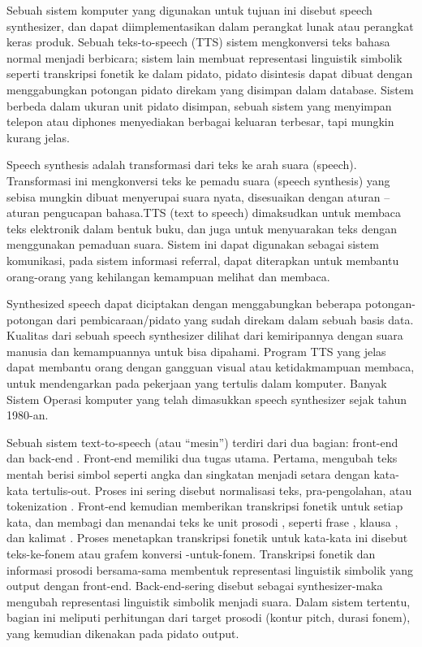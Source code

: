 Sebuah sistem komputer yang digunakan untuk tujuan ini disebut speech synthesizer, dan dapat diimplementasikan dalam perangkat lunak atau perangkat keras produk. Sebuah teks-to-speech (TTS) sistem mengkonversi teks bahasa normal menjadi berbicara; sistem lain membuat representasi linguistik simbolik seperti transkripsi fonetik ke dalam pidato, pidato disintesis dapat dibuat dengan menggabungkan potongan pidato direkam yang disimpan dalam database. Sistem berbeda dalam ukuran unit pidato disimpan, sebuah sistem yang menyimpan telepon atau diphones menyediakan berbagai keluaran terbesar, tapi mungkin kurang jelas.

Speech synthesis adalah transformasi dari teks ke arah suara (speech). Transformasi ini mengkonversi teks ke pemadu suara (speech synthesis) yang sebisa mungkin dibuat menyerupai suara nyata, disesuaikan dengan aturan – aturan pengucapan bahasa.TTS (text to speech) dimaksudkan untuk membaca teks elektronik dalam bentuk buku, dan juga untuk menyuarakan teks dengan menggunakan pemaduan suara. Sistem ini dapat digunakan sebagai sistem komunikasi, pada sistem informasi referral, dapat diterapkan untuk membantu orang-orang yang kehilangan kemampuan melihat dan membaca.

Synthesized speech dapat diciptakan dengan menggabungkan beberapa potongan-potongan dari pembicaraan/pidato yang sudah direkam dalam sebuah basis data. Kualitas dari sebuah speech synthesizer dilihat dari kemiripannya dengan suara manusia dan kemampuannya untuk bisa dipahami. Program TTS yang jelas dapat membantu orang dengan gangguan visual atau ketidakmampuan membaca, untuk mendengarkan pada pekerjaan yang tertulis dalam komputer. Banyak Sistem Operasi komputer yang telah dimasukkan speech synthesizer sejak tahun 1980-an.

Sebuah sistem text-to-speech (atau “mesin”) terdiri dari dua bagian: front-end dan back-end . Front-end memiliki dua tugas utama. Pertama, mengubah teks mentah berisi simbol seperti angka dan singkatan menjadi setara dengan kata-kata tertulis-out. Proses ini sering disebut normalisasi teks, pra-pengolahan, atau tokenization . Front-end kemudian memberikan transkripsi fonetik untuk setiap kata, dan membagi dan menandai teks ke unit prosodi , seperti frase , klausa , dan kalimat . Proses menetapkan transkripsi fonetik untuk kata-kata ini disebut teks-ke-fonem atau grafem konversi -untuk-fonem. Transkripsi fonetik dan informasi prosodi bersama-sama membentuk representasi linguistik simbolik yang output dengan front-end. Back-end-sering disebut sebagai synthesizer-maka mengubah representasi linguistik simbolik menjadi suara. Dalam sistem tertentu, bagian ini meliputi perhitungan dari target prosodi (kontur pitch, durasi fonem), yang kemudian dikenakan pada pidato output.


